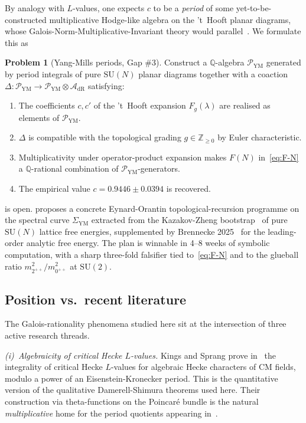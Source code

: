\documentclass[11pt]{amsart}
\theoremstyle{definition}
\newtheorem{problem}[theorem]{Problem}
\theoremstyle{remark}
\newcommand{\Q}{\mathbb{Q}}
\newcommand{\Z}{\mathbb{Z}}
\begin{document}
By analogy with $L$-values, one expects $c$ to be a \emph{period} of
some yet-to-be-constructed multiplicative Hodge-like algebra on the
't~Hooft planar diagrams, whose Galois-Norm-Multiplicative-Invariant
theory would parallel~. We formulate this as

\begin{problem}[Yang-Mills periods, Gap \#3]\label{prob:YM-periods}
Construct a $\Q$-algebra $\mathcal{P}_{\mathrm{YM}}$ generated by
period integrals of pure $\mathrm{SU}(N)$ planar diagrams together with
a coaction
$\Delta : \mathcal{P}_{\mathrm{YM}} \to \mathcal{P}_{\mathrm{YM}}
\otimes \mathcal{A}_{\mathrm{dR}}$
satisfying:
\begin{enumerate}
\item[\textup{(P1)}] The coefficients $c, c'$ of the 't~Hooft expansion
$F_g(\lambda)$ are realised as elements of $\mathcal{P}_{\mathrm{YM}}$.
\item[\textup{(P2)}] $\Delta$ is compatible with the topological grading
$g \in \Z_{\geq 0}$ by Euler characteristic.
\item[\textup{(P3)}] Multiplicativity under operator-product expansion
makes $F(N)$ in~\eqref{eq:F-N} a $\Q$-rational combination of
$\mathcal{P}_{\mathrm{YM}}$-generators.
\item[\textup{(P4)}] The empirical value $c = 0.9446 \pm 0.0394$ is
recovered.
\end{enumerate}
\end{problem}

 is open.  proposes a concrete
Eynard-Orantin topological-recursion programme on the spectral curve
$\Sigma_{\mathrm{YM}}$ extracted from the Kazakov-Zheng
bootstrap~\cite{KazakovZheng2024} of pure $\mathrm{SU}(N)$ lattice
free energies, supplemented by Brennecke 2025~\cite{Brennecke2025} for
the leading-order analytic free energy. The plan is winnable in 4--8
weeks of symbolic computation, with a sharp three-fold falsifier tied
to~\eqref{eq:F-N} and to the glueball ratio
$m_{2^{++}}^2 / m_{0^{++}}^2$ at $\mathrm{SU}(2)$.

\subsection{Position vs.\ recent literature}
\label{ss:lit}
The Galois-rationality phenomena studied here sit at the intersection
of three active research threads.

\emph{(i)~Algebraicity of critical Hecke $L$-values.}
Kings and Sprang prove in~\cite{KingsSprang2025} the integrality of
critical Hecke $L$-values for algebraic Hecke characters of CM
fields, modulo a power of an Eisenstein-Kronecker period. This is the
quantitative version of the qualitative Damerell-Shimura theorems used
here. Their construction via theta-functions on the Poincar\'e bundle
is the natural \emph{multiplicative} home for the period quotients
appearing in~.
\end{document}
